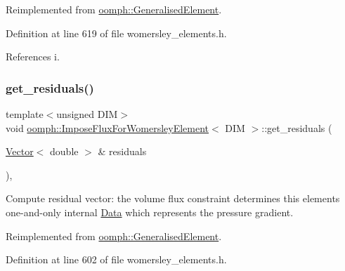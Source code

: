 Reimplemented from \hyperlink{classoomph_1_1GeneralisedElement_ab915bdad7e6643e5e73a6d98bc7cf48e}{oomph\+::\+Generalised\+Element}.



Definition at line 619 of file womersley\+\_\+elements.\+h.



References i.

\mbox{\label{classoomph_1_1ImposeFluxForWomersleyElement_a6109bae3e5eb55b567e7ea85fca10884}} 
\subsubsection{\texorpdfstring{get\+\_\+residuals()}{get\_residuals()}}
{\footnotesize\ttfamily template$<$unsigned D\+IM$>$ \\
void \hyperlink{classoomph_1_1ImposeFluxForWomersleyElement}{oomph\+::\+Impose\+Flux\+For\+Womersley\+Element}$<$ D\+IM $>$\+::get\+\_\+residuals (\begin{DoxyParamCaption}\item[{\hyperlink{classoomph_1_1Vector}{Vector}$<$ double $>$ \&}]{residuals }\end{DoxyParamCaption})\hspace{0.3cm}{\ttfamily [inline]}, {\ttfamily [virtual]}}



Compute residual vector\+: the volume flux constraint determines this element\textquotesingle{}s one-\/and-\/only internal \hyperlink{classoomph_1_1Data}{Data} which represents the pressure gradient. 



Reimplemented from \hyperlink{classoomph_1_1GeneralisedElement_a53d348ab71c86b53619129a1dd411d30}{oomph\+::\+Generalised\+Element}.



Definition at line 602 of file womersley\+\_\+elements.\+h.

\mbox{\label{classoomph_1_1ImposeFluxForWomersleyElement_a77a13b7dad46eaf222164be9a62b0269}} 
